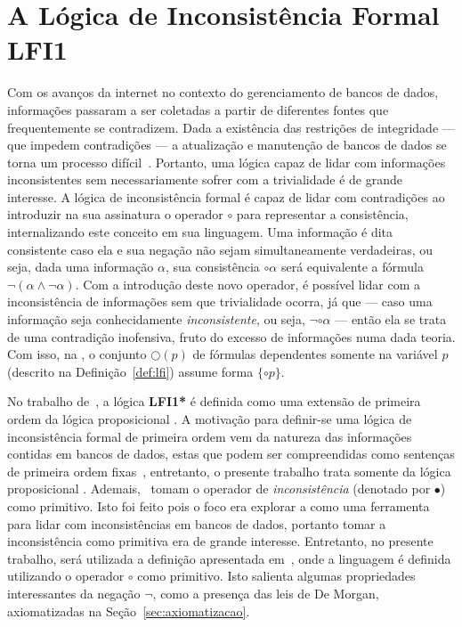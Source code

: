 \chapter{A Lógica de Inconsistência Formal LFI1}\label{cap:LFI1}

Com os avanços da internet no contexto do gerenciamento de bancos de dados, informações passaram a ser coletadas a partir de diferentes fontes que frequentemente se contradizem. Dada a existência das restrições de integridade {---} que impedem contradições {---} a atualização e manutenção de bancos de dados se torna um processo difícil~\cite{carnielli2000formal}. Portanto, uma lógica capaz de lidar com informações inconsistentes sem necessariamente sofrer com a trivialidade é de grande interesse. A lógica de inconsistência formal \lfium{} é capaz de lidar com contradições ao introduzir na sua assinatura o operador $\circ$ para representar a consistência, internalizando este conceito em sua linguagem. Uma informação é dita consistente caso ela e sua negação não sejam simultaneamente verdadeiras, ou seja, dada uma informação $\alpha$, sua consistência $\circ \alpha$ será equivalente a fórmula $\neg (\alpha \land \neg \alpha)$. Com a introdução deste novo operador, é possível lidar com a inconsistência de informações sem que trivialidade ocorra, já que {---} caso uma informação seja conhecidamente \textit{inconsistente}, ou seja, $\neg \circ \alpha$ {---} então ela se trata de uma contradição inofensiva, fruto do excesso de informações numa dada teoria. Com isso, na \lfium{}, o conjunto $\bigcirc(p)$ de fórmulas dependentes somente na variável $p$ (descrito na Definição~\ref{def:lfi}) assume forma $\{\circ p\}$.

No trabalho de~, a lógica \textbf{LFI1*} é definida como uma extensão de primeira ordem da lógica proposicional \lfium{}. A motivação para definir-se uma lógica de inconsistência formal de primeira ordem vem da natureza das informações contidas em bancos de dados, estas que podem ser compreendidas como sentenças de primeira ordem fixas~\cite{Codd}, entretanto, o presente trabalho trata somente da lógica proposicional \lfium{}. Ademais,~ tomam o operador de \textit{inconsistência} (denotado por $\bullet$) como primitivo. Isto foi feito pois o foco era explorar a \lfium{} como uma ferramenta para lidar com inconsistências em bancos de dados, portanto tomar a inconsistência como primitiva era de grande interesse. Entretanto, no presente trabalho, será utilizada a definição apresentada em~, onde a linguagem é definida utilizando o operador $\circ$ como primitivo. Isto salienta algumas propriedades interessantes da negação $\neg$, como a presença das leis de De Morgan, axiomatizadas na Seção~\ref{sec:axiomatizacao}.

